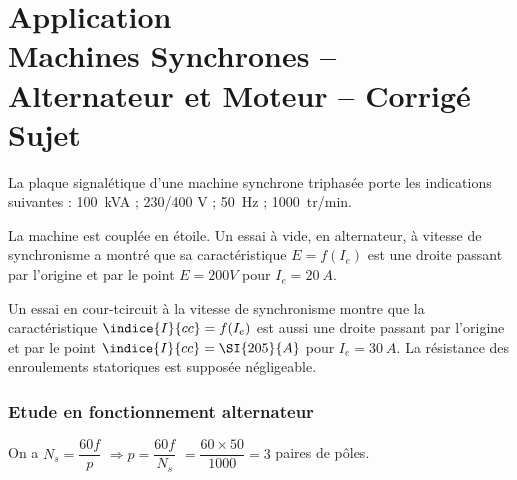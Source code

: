 \chapter*{Application  \\ 
Machines Synchrones -- Alternateur et Moteur
-- \ifprof Corrigé \else Sujet \fi}

\iflivret {} \else
\ifprof  {} \else \fi
\fi

\setcounter{question}{0}

La plaque signalétique d’une machine synchrone triphasée porte les indications suivantes : 
\SI{100}{kVA} ; 230/400 \si{V} ; \SI{50}{Hz} ; \SI{1000}{tr/min}. 

La machine est couplée en étoile.
Un essai à vide, en alternateur, à vitesse de synchronisme a montré que sa caractéristique $E=f(I_e)$   est une droite passant par l’origine et par le point $E = 200 V$ pour $I_e = \SI{20}{A}$.

Un essai en cour-tcircuit à la vitesse de synchronisme montre que la caractéristique $\indice{I}{cc}=f(I_e)$ est aussi une droite passant par l’origine et par le point $\indice{I}{cc} = \SI{205}{A}$ pour $I_e = \SI{30}{A}$.
La résistance des enroulements statoriques est supposée négligeable. 

\subsection*{Etude en fonctionnement alternateur}

\ifprof
\begin{corrige}
On a $N_s = \dfrac{60f}{p}$ $\Rightarrow p = \dfrac{60f}{N_s}$ $=\dfrac{60\times 50}{1000}=3$ paires de pôles.

\end{corrige}
\else
\fi



\ifprof
\begin{corrige}


\end{corrige}
\else
\fi

